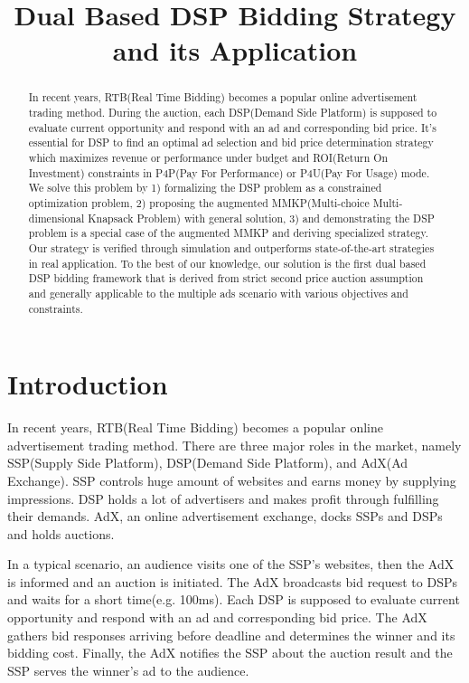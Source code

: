 \documentclass[sigconf]{acmart}
\begin{document}
\title{Dual Based DSP Bidding Strategy and its Application}

\begin{abstract}
In recent years, RTB(Real Time Bidding) becomes a popular online advertisement trading method.
During the auction, each DSP(Demand Side Platform) is supposed to
    evaluate current opportunity and respond with an ad and corresponding bid price.
It's essential for DSP to find an optimal ad selection and bid price determination strategy
    which maximizes revenue or performance under budget and ROI(Return On Investment) constraints
    in P4P(Pay For Performance) or P4U(Pay For Usage) mode.
We solve this problem by
    1) formalizing the DSP problem as a constrained optimization problem,
    2) proposing the augmented MMKP(Multi-choice Multi-dimensional Knapsack Problem) with general solution,
    3) and demonstrating the DSP problem is a special case of the augmented MMKP and deriving specialized strategy.
Our strategy is verified through simulation and outperforms state-of-the-art strategies in real application.
To the best of our knowledge, our solution is the first dual based DSP bidding framework
    that is derived from strict second price auction assumption and
    generally applicable to the multiple ads scenario with various objectives and constraints.
\end{abstract}


\maketitle

\section{Introduction} \label{Introduction}

In recent years, RTB(Real Time Bidding) becomes a popular online advertisement trading method.
There are three major roles in the market, namely SSP(Supply Side Platform), DSP(Demand Side Platform), and AdX(Ad Exchange).
SSP controls huge amount of websites and earns money by supplying impressions.
DSP holds a lot of advertisers and makes profit through fulfilling their demands.
AdX, an online advertisement exchange, docks SSPs and DSPs and holds auctions.

In a typical scenario, an audience visits one of the SSP's websites, then the AdX is informed and an auction is initiated.
The AdX broadcasts bid request to DSPs and waits for a short time(e.g. 100ms).
Each DSP is supposed to evaluate current opportunity and respond with an ad and corresponding bid price.
The AdX gathers bid responses arriving before deadline and determines the winner and its bidding cost.
Finally, the AdX notifies the SSP about the auction result and the SSP serves the winner's ad to the audience.
\end{document}
